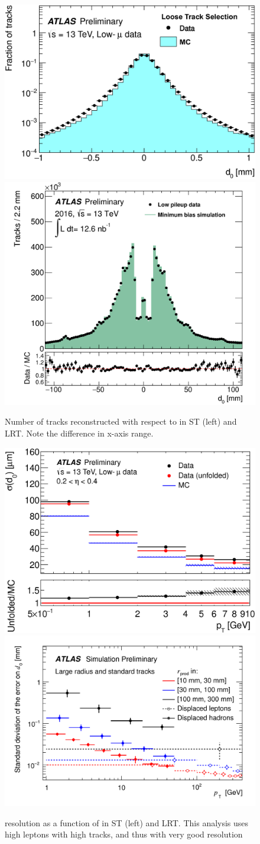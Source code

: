 \begin{figure}[htbp]
\centering
\includegraphics[width=.5\textwidth]{figures/EventReconstruction/ST-d0-eff.png}
\includegraphics[width=.41\textwidth]{figures/EventReconstruction/LRT-d0-eff.png}
\caption{Number of tracks reconstructed with respect to \dzero in \ac{ST} (left) and \ac{LRT}. Note the difference in x-axis range.}
\label{fig:trking_d0_eff}
\end{figure}

\begin{figure}[htbp]
\centering
\includegraphics[width=.45\textwidth]{figures/EventReconstruction/ST-d0-res.png}
\includegraphics[width=.5\textwidth]{figures/EventReconstruction/LRT-d0-res.png}
\caption{\dzero resolution as a function of \pt in \ac{ST} (left) and \ac{LRT}. This analysis uses high \pt leptons with high \pt tracks, and thus with very good \dzero resolution}
\label{fig:trking_d0_res}
\end{figure}

